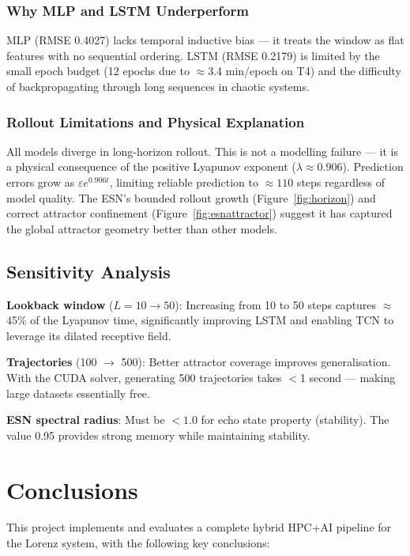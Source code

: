 \documentclass[11pt,a4paper]{article}
\begin{document}
\subsubsection{Why MLP and LSTM Underperform}
MLP (RMSE 0.4027) lacks temporal inductive bias --- it treats the window as flat
features with no sequential ordering. LSTM (RMSE 0.2179) is limited by the small
epoch budget (12 epochs due to $\approx$3.4 min/epoch on T4) and the difficulty of
backpropagating through long sequences in chaotic systems.

\subsubsection{Rollout Limitations and Physical Explanation}
All models diverge in long-horizon rollout. This is not a modelling failure --- it is
a physical consequence of the positive Lyapunov exponent ($\lambda \approx 0.906$).
Prediction errors grow as $\varepsilon e^{0.906 t}$, limiting reliable prediction to
$\approx 110$ steps regardless of model quality. The ESN's bounded rollout growth
(Figure~\ref{fig:horizon}) and correct attractor confinement (Figure~\ref{fig:esnattractor})
suggest it has captured the global attractor geometry better than other models.

\subsection{Sensitivity Analysis}

\textbf{Lookback window} ($L=10 \to 50$): Increasing from 10 to 50 steps captures
$\approx$45\% of the Lyapunov time, significantly improving LSTM and enabling TCN to
leverage its dilated receptive field.

\textbf{Trajectories} (100 $\to$ 500): Better attractor coverage improves
generalisation. With the CUDA solver, generating 500 trajectories takes
$<$1 second --- making large datasets essentially free.

\textbf{ESN spectral radius}: Must be $<1.0$ for echo state property (stability).
The value 0.95 provides strong memory while maintaining stability.

\section{Conclusions}

This project implements and evaluates a complete hybrid HPC+AI pipeline for the
Lorenz system, with the following key conclusions:
\end{document}
